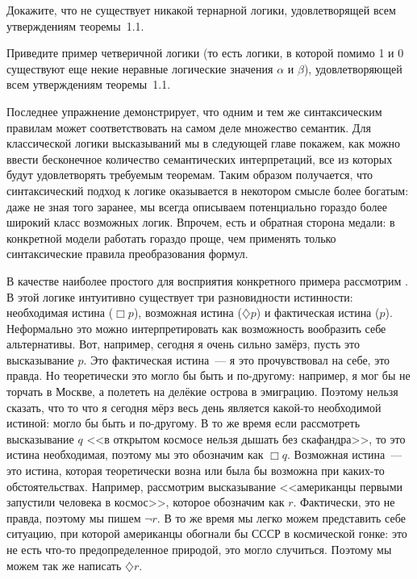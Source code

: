\begin{exercise}
Докажите, что не существует никакой тернарной логики, удовлетворящей всем утверждениям теоремы~1.1.
\end{exercise}

\begin{exercise}
Приведите пример четверичной логики (то есть логики, в которой помимо 1 и 0 существуют еще некие неравные логические значения $\alpha$ и $\beta$), удовлетворяющей всем утверждениям теоремы~1.1.
\end{exercise}

Последнее упражнение демонстрирует, что одним и тем же синтаксическим правилам может соответствовать на самом деле множество семантик. Для классической логики высказываний мы в следующей главе покажем, как можно ввести бесконечное количество семантических интерпретаций, все из которых будут удовлетворять требуемым теоремам. Таким образом получается, что синтаксический подход к логике оказывается в некотором смысле более богатым: даже не зная того заранее, мы всегда описываем потенциально гораздо более широкий класс возможных логик. Впрочем, есть и обратная сторона медали: в конкретной модели работать гораздо проще, чем применять только синтаксические правила преобразования формул.

В качестве наиболее простого для восприятия конкретного примера рассмотрим . В этой логике интуитивно существует три разновидности истинности: необходимая истина ($\Box p$), возможная истина ($\diamondsuit p$) и фактическая истина ($p$). Неформально это можно интерпретировать как возможность вообразить себе альтернативы. Вот, например, сегодня я очень сильно замёрз, пусть это высказывание $p$. Это фактическая истина~--- я это прочувствовал на себе, это правда. Но теоретически это могло бы быть и по-другому: например, я мог бы не торчать в Москве, а полететь на делёкие острова в эмиграцию. Поэтому нельзя сказать, что то что я сегодня мёрз весь день является какой-то необходимой истиной: могло бы быть и по-другому. В то же время если рассмотреть высказывание $q$ <<в открытом космосе нельзя дышать без скафандра>>, то это истина необходимая, поэтому мы это обозначим как $\Box q$. Возможная истина~--- это истина, которая теоретически возна или была бы возможна при каких-то обстоятельствах. Например, рассмотрим высказывание <<американцы первыми запустили человека в космос>>, которое обозначим как $r$. Фактически, это не правда, поэтому мы пишем $\neg r$. В то же время мы легко можем представить себе ситуацию, при которой американцы обогнали бы СССР в космической гонке: это не есть что-то предопределенное природой, это могло случиться. Поэтому мы можем так же написать $\diamondsuit r$. 

